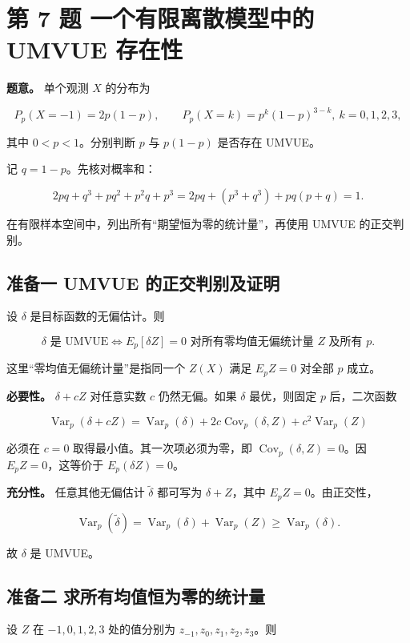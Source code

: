 \section{第 7 题 一个有限离散模型中的 UMVUE 存在性}

\textbf{题意。} 单个观测 $X$ 的分布为

\[
P_p(X=-1)=2p(1-p),\qquad
P_p(X=k)=p^k(1-p)^{3-k},\ k=0,1,2,3,
\]

其中 $0<p<1$。分别判断 $p$ 与 $p(1-p)$ 是否存在 UMVUE。

记 $q=1-p$。先核对概率和：

\[
2pq+q^3+pq^2+p^2q+p^3
=2pq+(p^3+q^3)+pq(p+q)=1.
\]

 在有限样本空间中，列出所有“期望恒为零的统计量”，再使用 UMVUE 的正交判别。

\subsection{准备一 UMVUE 的正交判别及证明}

设 $\delta$ 是目标函数的无偏估计。则

\[
\boxed{\delta\text{ 是 UMVUE}
\iff E_p[\delta Z]=0
\text{ 对所有零均值无偏统计量 }Z\text{ 及所有 }p.}
\]

这里“零均值无偏统计量”是指同一个 $Z(X)$ 满足 $E_pZ=0$ 对全部 $p$ 成立。

\textbf{必要性。} $\delta+cZ$ 对任意实数 $c$ 仍然无偏。如果 $\delta$ 最优，则固定 $p$ 后，二次函数

\[
\operatorname{Var}_p(\delta+cZ)
=\operatorname{Var}_p(\delta)
+2c\operatorname{Cov}_p(\delta,Z)
+c^2\operatorname{Var}_p(Z)
\]

必须在 $c=0$ 取得最小值。其一次项必须为零，即 $\operatorname{Cov}_p(\delta,Z)=0$。因 $E_pZ=0$，这等价于 $E_p(\delta Z)=0$。

\textbf{充分性。} 任意其他无偏估计 $\tilde\delta$ 都可写为 $\delta+Z$，其中 $E_pZ=0$。由正交性，

\[
\operatorname{Var}_p(\tilde\delta)
=\operatorname{Var}_p(\delta)+\operatorname{Var}_p(Z)
\ge\operatorname{Var}_p(\delta).
\]

故 $\delta$ 是 UMVUE。

\subsection{准备二 求所有均值恒为零的统计量}

设 $Z$ 在 $-1,0,1,2,3$ 处的值分别为 $z_{-1},z_0,z_1,z_2,z_3$。则

